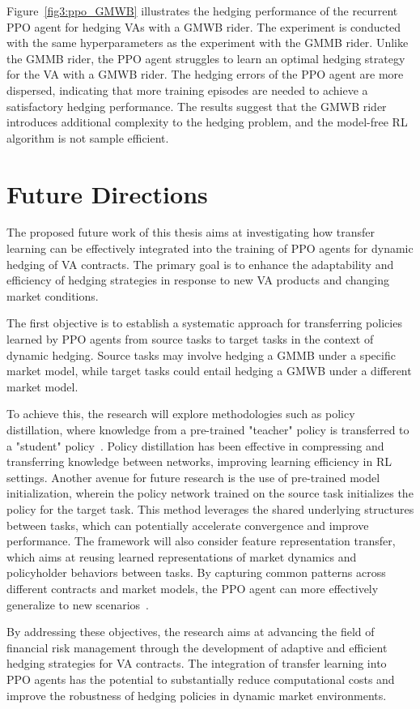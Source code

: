 Figure~\ref{fig3:ppo_GMWB} illustrates the hedging performance of the recurrent PPO agent for hedging VAs with a GMWB rider.
The experiment is conducted with the same hyperparameters as the experiment with the GMMB rider.
Unlike the GMMB rider, the PPO agent struggles to learn an optimal hedging strategy for the VA with a GMWB rider.
The hedging errors of the PPO agent are more dispersed, indicating that more training episodes are needed to achieve a satisfactory hedging performance.
The results suggest that the GMWB rider introduces additional complexity to the hedging problem, and the model-free RL algorithm is not sample efficient.

\section{Future Directions} \label{sec:FutureDirections}

The proposed future work of this thesis aims at investigating how transfer learning can be effectively integrated into the training of PPO agents for dynamic hedging of VA contracts. 
The primary goal is to enhance the adaptability and efficiency of hedging strategies in response to new VA products and changing market conditions. 


The first objective is to establish a systematic approach for transferring policies learned by PPO agents from source tasks to target tasks in the context of dynamic hedging. 
Source tasks may involve hedging a GMMB under a specific market model, while target tasks could entail hedging a GMWB under a different market model.

To achieve this, the research will explore methodologies such as policy distillation, where knowledge from a pre-trained "teacher" policy is transferred to a "student" policy~\citep{rusu2015policy}.
Policy distillation has been effective in compressing and transferring knowledge between networks, improving learning efficiency in RL settings.
Another avenue for future research is the use of pre-trained model initialization, wherein the policy network trained on the source task initializes the policy for the target task. 
This method leverages the shared underlying structures between tasks, which can potentially accelerate convergence and improve performance.
The framework will also consider feature representation transfer, which aims at reusing learned representations of market dynamics and policyholder behaviors between tasks. 
By capturing common patterns across different contracts and market models, the PPO agent can more effectively generalize to new scenarios~\citep{bengio2012deep}.

By addressing these objectives, the research aims at advancing the field of financial risk management through the development of adaptive and efficient hedging strategies for VA contracts. The integration of transfer learning into PPO agents has the potential to substantially reduce computational costs and improve the robustness of hedging policies in dynamic market environments.